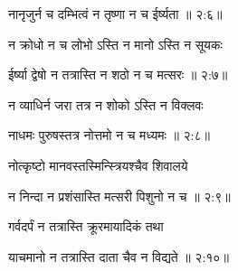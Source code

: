 
{\devanagarifont नानृजुर्न च दम्भित्वं न तृष्णा न च ईर्ष्यता {॥ २:६॥} \veg\dontdisplaylinenum }%

{\devanagarifont न क्रोधो न च लोभो ऽस्ति न मानो ऽस्ति न सूयकः \thinspace{\dandab} \dontdisplaylinenum }%


{\devanagarifont ईर्ष्या द्वेषो न तत्रास्ति न शठो न च मत्सरः {॥ २:७॥} \veg\dontdisplaylinenum }%

{\devanagarifont न व्याधिर्न जरा तत्र न शोको ऽस्ति न विक्लवः \thinspace{\dandab} \dontdisplaylinenum }%


{\devanagarifont नाधमः पुरुषस्तत्र नोत्तमो न च मध्यमः {॥ २:८॥} \veg\dontdisplaylinenum }%
 
{\devanagarifont नोत्कृष्टो मानवस्तस्मिन्स्त्रियश्चैव शिवालये \thinspace{\dandab} \dontdisplaylinenum }%


{\devanagarifont न निन्दा न प्रशंसास्ति मत्सरी पिशुनो न च {॥ २:९॥} \veg\dontdisplaylinenum }%

{\devanagarifont गर्वदर्पं न तत्रास्ति क्रूरमायादिकं तथा \thinspace{\dandab} \dontdisplaylinenum }%
 

{\devanagarifont याचमानो न तत्रास्ति दाता चैव न विद्यते {॥ २:१०॥} \veg\dontdisplaylinenum }%

